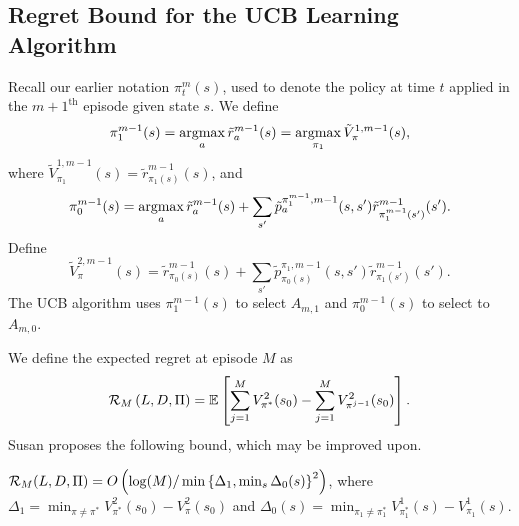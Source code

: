 \documentclass[11pt]{article}
\begin{document}
\subsection{Regret Bound for the UCB Learning Algorithm}
Recall our earlier notation $\pi_{t}^{m}(s)$, used to denote the policy at time $t$ applied in the $m+1^\text{th}$ episode given state $s$. We define
\[
	\pi_{1}^{m-1}(s) = \operatorname*{argmax}_{a} \tilde{r}_{a}^{m-1}(s) = \operatorname*{argmax}_{\pi_{1}} \tilde{V}_{\pi}^{1, m-1}(s),
\]
where $\tilde{V}_{\pi_1}^{1, m-1}(s) = \tilde{r}_{\pi_{1}(s)}^{m-1}(s)$, and
\[
	\pi_{0}^{m-1}(s) = \operatorname*{argmax}_{a} \tilde{r}_{a}^{m-1}(s) + \sum_{s'} \tilde{p}_{a}^{\pi_{1}^{m-1}, m-1}(s,s') \tilde{r}_{\pi_{1}^{m-1}(s')}^{m-1}(s').
\]
Define 
\[
	\tilde{V}_{\pi}^{2, m-1}(s) = \tilde{r}_{\pi_{0}(s)}^{m-1}(s) + \sum_{s'} \tilde{p}_{\pi_{0}(s)}^{\pi_{1}, m-1}(s,s') \tilde{r}_{\pi_{1}(s')}^{m-1}(s').
\]
The UCB algorithm uses $\pi_{1}^{m-1}(s)$ to select $A_{m,1}$ and $\pi_{0}^{m-1}(s)$ to select to $A_{m,0}$.

We define the expected regret at episode $M$ as 
\[
	\mathcal{R}_{M}\left(L, D, \Pi\right) = \mathbb{E}\left[\sum_{j=1}^{M} V_{\pi^{*}}^{2}(s_{0}) - \sum_{j=1}^{M} V_{\pi^{j-1}}^{2}(s_{0}) \right].
\]
Susan proposes the following bound, which may be improved upon.
\begin{proposition}
	$\mathcal{R}_{M}(L, D, \Pi) = O\left(\log(M) / \min\left\{\Delta_{1}, \min_{s}\Delta_{0}(s)\right\}^{2}\right)$, where $\Delta_{1} = \min_{\pi\neq\pi^{*}} V_{\pi^*}^{2}(s_{0}) - V_{\pi}^{2}(s_{0})$ and $\Delta_{0}(s) = \min_{\pi_{1}\neq \pi_{1}^{*}} V_{\pi_{1}^{*}}^{1}(s) - V_{\pi_{1}}^{1}(s)$.
\end{proposition}
\end{document}

